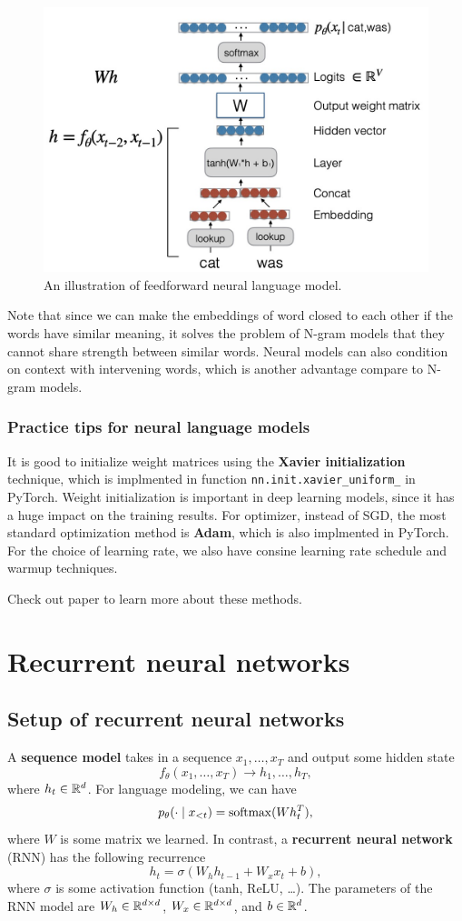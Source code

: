 \documentclass[a4paper]{article}
\begin{document}
\begin{figure}[h!]
  \centering
  \includegraphics[width=0.5\linewidth]{figs/forward-nn-lm.jpg}
  \caption{An illustration of feedforward neural language 
  model.}
  \label{feedforward-nn-lm}
\end{figure}

Note that since we can make the embeddings of word closed to 
each other if the words have similar meaning, it solves the 
problem of N-gram models that they cannot share strength 
between similar words. Neural models can also condition 
on context with intervening words, which is another advantage
compare to N-gram models.

\subsubsection{Practice tips for neural language models}
It is good to initialize weight matrices
using the \textbf{Xavier initialization} technique, which is 
implmented in function \texttt{nn.init.xavier\_uniform\_} 
in PyTorch. Weight initialization
is important in deep learning models, since it has a huge 
impact on the training results. 
For optimizer, instead of SGD, the most 
standard optimization method is \textbf{Adam}, 
which is also implmented in PyTorch. 
For the choice of learning rate, 
we also have consine learning rate schedule and warmup 
techniques.

Check out paper to learn more about these methods.

\section{Recurrent neural networks}

\subsection{Setup of recurrent neural networks}
A \textbf{sequence model} takes in a sequence $x_1, \dots,
x_T$ and output some hidden state 
\[
f_\theta(x_1, \dots, x_T) \to h_1, \dots, h_T,
\]
where $h_t \in \mathbb{R}^d$. For language modeling, we can have 
\[
p_\theta(\cdot \mid x_{<t}) = \operatorname{softmax} (W h_t^T),
\]
where $W$ is some matrix we learned. 
In contrast, a \textbf{recurrent neural network} (RNN)
has the following recurrence 
\[
h_t = \sigma(W_h h_{t-1} + W_x x_t + b),
\]
where $\sigma$ is some activation function (tanh, ReLU, \dots).
The parameters of the RNN model are $W_h \in \mathbb{R}^{d \times d}$, 
$W_x \in \mathbb{R}^{d \times d}$, and $b \in \mathbb{R}^d$.
\end{document}
